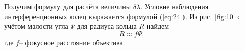 Получим формулу для расчёта величины $\delta \lambda$. Условие наблюдения интерференционных колец выражается формулой (\ref{eq:24}). Из рис. \ref{fig:10}  с учётом малости угла $\Psi$ для радиуса кольца $R$ найдем
\begin{equation}
	R\approx f\Psi,
\end{equation}
где $f$-- фокусное расстояние объектива.
\begin{description}
	\item[] 
\end{description}